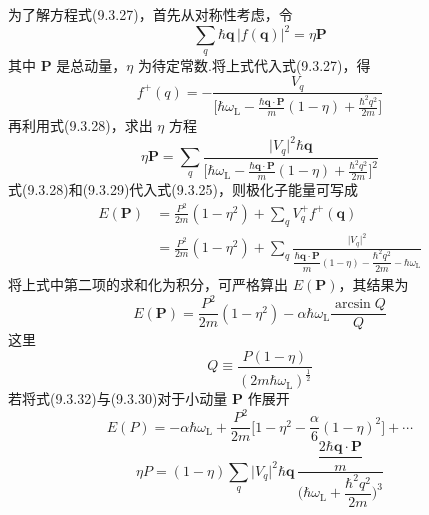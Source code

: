 为了解方程式(9.3.27)，首先从对称性考虑，令
\begin{equation}
  \sum_{q}\hbar\boldsymbol{q}\,\bigl|f(\boldsymbol{q})\bigr|^{2}=\eta\boldsymbol{P}
\end{equation}
其中 $\boldsymbol{P}$ 是总动量，$\eta$ 为待定常数.将上式代入式(9.3.27)，得
\begin{equation}
  f^{+}(q)=-\frac{V_{q}}{\biggl[\hbar\omega_{\mathrm L}
  -\frac{\hbar\boldsymbol{q}\cdot\boldsymbol{P}}{m}(1-\eta)
  +\frac{\hbar^{2}q^{2}}{2m}\biggr]}
\end{equation}
再利用式(9.3.28)，求出 $\eta$ 方程
\begin{equation}
  \eta\boldsymbol{P}=\sum_{q}
  \frac{\bigl|V_{q}\bigr|^{2}\hbar\boldsymbol{q}}{\biggl[\hbar\omega_{\mathrm L}
  -\frac{\hbar\boldsymbol{q}\cdot\boldsymbol{P}}{m}(1-\eta)
  +\frac{\hbar^{2}q^{2}}{2m}\biggr]^{2}}
\end{equation}
式(9.3.28)和(9.3.29)代入式(9.3.25)，则极化子能量可写成
\begin{equation}
\begin{aligned}
  E(\boldsymbol{P})&=\frac{P^{2}}{2m}(1-\eta^{2})
  +\sum_{q}V_{q}^{+}f^{+}(\boldsymbol{q})\\
  &=\frac{P^{2}}{2m}(1-\eta^{2})
  +\sum_{q}\frac{\bigl|V_{q}\bigr|^{2}}{\dfrac{\hbar\boldsymbol{q}\cdot\boldsymbol{P}}{m}(1-\eta)
  -\dfrac{\hbar^{2}q^{2}}{2m}-\hbar\omega_{\mathrm L}}
\end{aligned}
\end{equation}
将上式中第二项的求和化为积分，可严格算出 $E(\boldsymbol{P})$，其结果为
\begin{equation}
  E(\boldsymbol{P})=\frac{P^{2}}{2m}(1-\eta^{2})
  -\alpha\hbar\omega_{\mathrm L}\frac{\arcsin Q}{Q}
\end{equation}
这里
\begin{equation}
  Q\equiv\frac{P(1-\eta)}{\left(2m\hbar\omega_{\mathrm L}\right)^{\frac{1}{2}}}
\end{equation}
若将式(9.3.32)与(9.3.30)对于小动量 $\boldsymbol{P}$ 作展开
\begin{equation}
  E(P)=-\alpha\hbar\omega_{\mathrm L}+\frac{P^{2}}{2m}
  \biggl[1-\eta^{2}-\frac{\alpha}{6}(1-\eta)^{2}\biggr]+\cdots
\end{equation}
\begin{equation}
  \eta P=(1-\eta)\sum_{q}\bigl|V_{q}\bigr|^{2}\hbar\boldsymbol{q}\,
  \frac{\dfrac{2\hbar\boldsymbol{q}\cdot\boldsymbol{P}}{m}}
  {\biggl(\hbar\omega_{\mathrm L}+\dfrac{\hbar^{2}q^{2}}{2m}\biggr)^{3}}
\end{equation}
